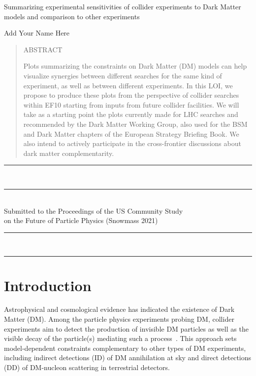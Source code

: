\documentclass[11pt]{article}
\newcommand\pubnumber{Preprint Number Goes Here?}
\newcommand\pubdate{\today}
\def\Title#1{\begin{center} {\LARGE #1 } \end{center}}
\def\Author#1{\begin{center}{ \sc #1} \end{center}}
\def\Address#1{\begin{center}{ \it #1} \end{center}}
\newcommand\pubblock{\rightline{\begin{tabular}{l} \pubnumber\\
         \pubdate \end{tabular}}}
\newenvironment{Abstract}{\begin{quotation} \begin{center}
                       ABSTRACT
     \end{center}\bigskip  }{\end{quotation}}
\newcommand\snowmass{\begin{center}\rule[-0.2in]{\hsize}{0.01in}\\\rule{\hsize}{0.01in}\\
\vskip 0.1in Submitted to the  Proceedings of the US Community Study\\ 
on the Future of Particle Physics (Snowmass 2021)\\ 
\rule{\hsize}{0.01in}\\\rule[+0.2in]{\hsize}{0.01in} \end{center}}
\begin{document}
\pubblock

\Title{Summarizing experimental sensitivities of collider experiments to Dark Matter models and comparison to other experiments}

\bigskip 

\Author{Add Your Name Here}




\medskip

 \begin{Abstract}
\noindent Plots summarizing the constraints on Dark Matter (DM) models can help visualize synergies between different searches for the same kind of experiment, as well as between different experiments. 
In this LOI, we propose to produce these plots from the perspective of collider searches within EF10 starting from inputs from future collider facilities. We will take as a starting point the plots currently made for LHC searches and recommended by the Dark Matter Working Group, also used for the BSM and Dark Matter chapters of the European Strategy Briefing Book. We also intend to actively participate in the cross-frontier discussions about dark matter complementarity. 
\end{Abstract}


\snowmass

\def\thefootnote{\fnsymbol{footnote}}
\setcounter{footnote}{0}
%

\section{Introduction}

Astrophysical and cosmological evidence has indicated the existence of Dark Matter (DM). Among the particle physics experiments probing DM, collider experiments aim to detect the production of invisible DM particles as well as the visible decay of the particle(s) mediating such a process~\cite{Kahlhoefer:2017dnp}. This approach sets model-dependent constraints complementary to other types of DM experiments, including indirect detections (ID) of DM annihilation at sky and direct detections (DD) of DM-nucleon scattering in terrestrial detectors.
\end{document}
